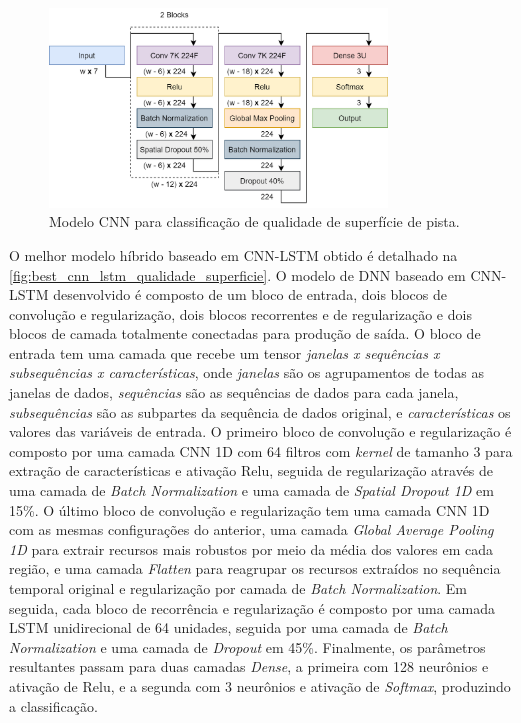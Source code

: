 \begin{figure}[h!]
  \centering
  \caption{Modelo CNN para classificação de qualidade de superfície de pista.}
  \label{fig:best_cnn_qualidade_superficie}
  \includegraphics[width=0.8\textwidth]{figuras/fig_48.png}
\end{figure}

O melhor modelo híbrido baseado em CNN-LSTM obtido é detalhado na \autoref{fig:best_cnn_lstm_qualidade_superficie}. O modelo de DNN baseado em CNN-LSTM desenvolvido é composto de um bloco de entrada, dois blocos de convolução e regularização, dois blocos recorrentes e de regularização e dois blocos de camada totalmente conectadas para produção de saída. O bloco de entrada tem uma camada que recebe um tensor \emph{janelas x sequências x subsequências x características}, onde \emph{janelas} são os agrupamentos de todas as janelas de dados, \emph{sequências} são as sequências de dados para cada janela, \emph{subsequências} são as subpartes da sequência de dados original, e \emph{características} os valores das variáveis de entrada. O primeiro bloco de convolução e regularização é composto por uma camada CNN 1D com 64 filtros com \textit{kernel} de tamanho 3 para extração de características e ativação Relu, seguida de regularização através de uma camada de \textit{Batch Normalization} e uma camada de \textit{Spatial Dropout 1D} em 15\%. O último bloco de convolução e regularização tem uma camada CNN 1D com as mesmas configurações do anterior, uma camada \textit{Global Average Pooling 1D} para extrair recursos mais robustos por meio da média dos valores em cada região, e uma camada \textit{Flatten} para reagrupar os recursos extraídos no sequência temporal original e regularização por camada de \textit{Batch Normalization}. Em seguida, cada bloco de recorrência e regularização é composto por uma camada LSTM unidirecional de 64 unidades, seguida por uma camada de \textit{Batch Normalization} e uma camada de \textit{Dropout} em 45\%. Finalmente, os parâmetros resultantes passam para duas camadas \textit{Dense}, a primeira com 128 neurônios e ativação de Relu, e a segunda com 3 neurônios e ativação de \textit{Softmax}, produzindo a classificação. 

